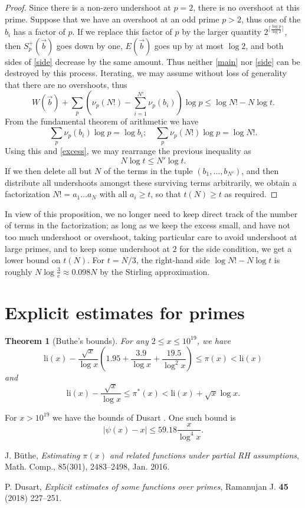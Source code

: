 \documentclass[12pt,a4paper,reqno]{amsart}
\numberwithin{equation}{section}
\theoremstyle{plain}
\newtheorem{theorem}{Theorem}[section]
\theoremstyle{definition}
\begin{document}
\begin{proof}  Since there is a non-zero undershoot at $p=2$, there is no overshoot at this prime. Suppose that we have an overshoot at an odd prime $p>2$, thus one of the $b_i$ has a factor of $p$. If we replace this factor of $p$ by the larger quantity $2^{\lceil \frac{\log p}{\log 2} \rceil}$, then $S^+_p(\vec b)$ goes down by one, $E(\vec b)$ goes up by at most $\log 2$, and both sides of \eqref{side} decrease by the same amount.  Thus neither \eqref{main} nor \eqref{side} can be destroyed by this process.  Iterating, we may assume without loss of generality that there are no overshoots, thus
 $$  W(\vec b) + \sum_p (\nu_p(N!) - \sum_{i=1}^{N'} \nu_p(b_i))\log p \leq \log N! - N \log t.$$
From the fundamental theorem of arithmetic we have
$$ \sum_p \nu_p(b_i) \log p = \log b_i; \quad \sum_p \nu_p(N!) \log p = \log N!.$$
Using this and \eqref{excess}, we may rearrange the previous inequality as
$$ N \log t \leq N' \log t.$$
If we then delete all but $N$ of the terms in the tuple $(b_1,\dots,b_{N'})$, and then distribute all undershoots amongst these surviving terms arbitrarily, we obtain a factorization $N! = a_1 \dots a_N$ with all $a_i \geq t$, so that $t(N) \geq t$ as required.
\end{proof}

In view of this proposition, we no longer need to keep direct track of the number of terms in the factorization; as long as we keep the excess small, and have not too much undershoot or overshoot, taking particular care to avoid undershoot at large primes, and to keep some undershoot at $2$ for the side condition, we get a lower bound on $t(N)$.  For $t = N/3$, the right-hand side $\log N! - N \log t$ is roughly $N \log \frac{3}{e} \approx 0.098 N$ by the Stirling approximation.






\section{Explicit estimates for primes}

\begin{theorem}[Buthe's bounds]\cite{buthe}  For any $2 \leq x \leq 10^{19}$, we have
$$ \mathrm{li}(x) - \frac{\sqrt{x}}{\log x}(1.95 + \frac{3.9}{\log x} + \frac{19.5}{\log^2 x}) \leq \pi(x) < \mathrm{li}(x)$$
and
$$ \mathrm{li}(x) - \frac{\sqrt{x}}{\log x} \leq \pi^*(x) < \mathrm{li}(x) + \sqrt{x}{\log x}.$$
\end{theorem}

For $x > 10^{19}$ we have the bounds of Dusart \cite{dusart}.  One such bound is
$$ |\psi(x) - x| \leq 59.18 \frac{x}{\log^4 x}.$$



\begin{thebibliography}{10}

J. B\"uthe, \emph{Estimating $\pi(x)$ and related functions under partial RH assumptions}, Math. Comp., 85(301), 2483--2498, Jan. 2016.

P. Dusart, \emph{Explicit estimates of some functions over primes}, Ramanujan J. \textbf{45} (2018) 227--251.


\end{thebibliography}
\end{document}
